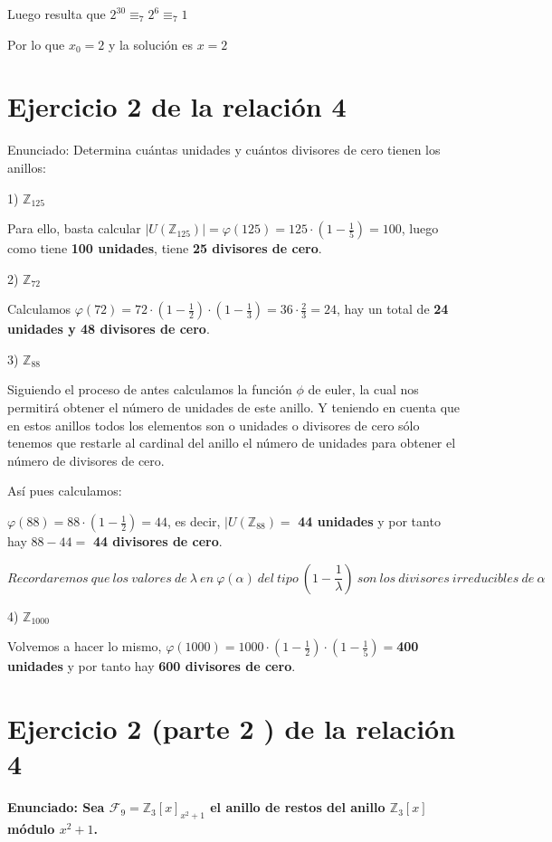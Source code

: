 \documentclass[11pt, a4paper, titlepage]{article}
\providecommand{\ent}{\mathbb{Z}}
\theoremstyle{theorem-style}
\theoremstyle{definition-style}
\theoremstyle{remark-style}
\theoremstyle{example-style}
\begin{document}
Luego resulta que $2^{30}\equiv_7 2^6 \equiv_7 1$

Por lo que $x_0 = 2$ y la solución es $x=2$


\section{Ejercicio 2 de la relación 4}

Enunciado: Determina cuántas unidades y cuántos divisores de cero tienen los anillos:

1) $\ent_{125}$

Para ello, basta calcular $|U(\ent_{125})| = \varphi(125) = 125 \cdot(1-\frac{1}{5}) = 100$, luego como tiene \textbf{100 unidades}, tiene \textbf{25 divisores de cero}.

2) $\ent_{72}$

Calculamos $\varphi(72) = 72\cdot(1-\frac{1}{2})\cdot(1-\frac{1}{3}) = 36\cdot \frac{2}{3} = 24$, hay un total de \textbf{24 unidades y 48 divisores de cero}.


3) $\ent_{88}$

Siguiendo el proceso de antes calculamos la función $\phi$ de euler, la cual nos permitirá obtener el número de unidades de este anillo.
Y teniendo en cuenta que en estos anillos todos los elementos son o unidades o divisores de cero sólo tenemos que restarle al cardinal del anillo el número de unidades para obtener el número de divisores de cero.

Así pues calculamos:

$\varphi(88) = 88\cdot(1-\frac{1}{2}) = 44$, es decir, $|U(\ent_{88}) =$ \textbf{44 unidades} y por tanto hay $88-44=$ \textbf{44 divisores de cero}.

$$Recordaremos\ que\ los\ valores\ de\ \lambda\ en\ \varphi(\alpha)\ del\ tipo\ (1-\frac{1}{\lambda})\ son\ los\ divisores\ irreducibles\ de\ \alpha$$


4) $\ent_{1000}$

Volvemos a hacer lo mismo, $\varphi(1000) = 1000\cdot(1-\frac{1}{2})\cdot(1-\frac{1}{5}) = $\textbf{400 unidades} y por tanto hay \textbf{600 divisores de cero}.


\section{Ejercicio 2 (parte 2 ) de la relación 4}

\textbf{Enunciado: Sea $\mathcal{F}_9 = \ent_3[x]_{ x^2 +1}$ el anillo de restos del anillo $\ent_3[x]$ módulo $x^2 +1$.}
\end{document}
